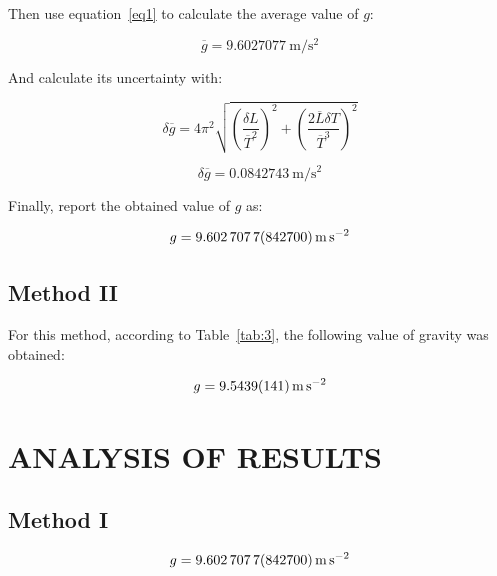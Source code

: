 \documentclass[11pt,a4paper]{article}
\begin{document}
Then use equation~\eqref{eq1} to calculate the average value of $g$:

\begin{equation}
\overline{g}=\qty{9.6027077}{\m\per\s\squared}
\label{eq12}
\end{equation}

And calculate its uncertainty with:

\begin{equation}
\delta\overline{g}
=
4\pi^{2}
\sqrt{
\left(\frac{\delta L}{\overline{T}^{2}}\right)^2
+
\left(\frac{2\overline{L}\delta T}{\overline{T}^{3}}\right)^2
}
\label{eq13}
\end{equation}

\begin{equation}
\delta\overline{g}=\qty{0.0842743}{\m\per\s\squared}
\label{eq13_1}
\end{equation}

Finally, report the obtained value of $g$ as:

\begin{equation}
g=\qty{9.6027077 \pm 0.08427}{\m\per\s\squared}
\label{eq14}
\end{equation}

\subsection*{Method II}

For this method, according to Table~\ref{tab:3}, the following value of gravity was obtained:

\begin{equation}
g=\qty{9.5439 \pm 0.0141}{\m\per\s\squared}
\label{eq14_1}
\end{equation}



\section{ANALYSIS OF RESULTS}

\subsection*{Method I}

\begin{equation}
g=\qty{9.6027077 \pm 0.08427}{\m\per\s\squared}
\end{equation}
\end{document}
